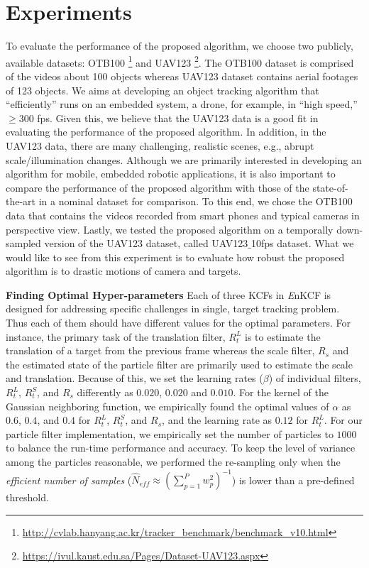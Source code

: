 \documentclass{bmvc2k}
\begin{document}
\section{Experiments} \label{sc:Experiments}
To evaluate the performance of the proposed algorithm, we choose two
publicly, available datasets:
OTB100 \footnote{\url{http://cvlab.hanyang.ac.kr/tracker_benchmark/benchmark_v10.html}}
and
UAV123 \footnote{\url{https://ivul.kaust.edu.sa/Pages/Dataset-UAV123.aspx}}\cite{mueller2016uav123}.
The OTB100 dataset is comprised of the videos about 100 objects
whereas UAV123 dataset contains aerial footages of 123 objects. We
aims at developing an object tracking algorithm that ``efficiently''
runs on an embedded system, a drone, for example, in ``high speed,''
$\ge 300$ fps. Given this, we believe that the UAV123 data is a good
fit in evaluating the performance of the proposed algorithm. In
addition, in the UAV123 data, there are many challenging, realistic
scenes, e.g., abrupt scale/illumination changes. Although we are
primarily interested in developing an algorithm for mobile, embedded
robotic applications, it is also important to compare the performance
of the proposed algorithm with those of the state-of-the-art in a
nominal dataset for comparison. To this end, we chose the OTB100 data
that contains the videos recorded from smart phones and typical
cameras in perspective view. Lastly, we tested the proposed algorithm
on a temporally down-sampled version of the UAV123 dataset, called
UAV123$\_$10fps dataset. What we would like to see from this
experiment is to evaluate how robust the proposed algorithm is to
drastic motions of camera and targets.

\textbf{Finding Optimal Hyper-parameters} Each of three KCFs in {\it
  E}nKCF is designed for addressing specific challenges in single,
target tracking problem. Thus each of them should have different
values for the optimal parameters. For instance, the primary task of
the translation filter, $R_{t}^{L}$ is to estimate the translation of
a target from the previous frame whereas the scale filter, $R_{s}$ and
the estimated state of the particle filter are primarily used to
estimate the scale and translation. Because of this, we set the
learning rates ($\beta$) of individual filters, $R_{t}^{L}$,
$R_{t}^{S}$, and $R_{s}$ differently as $0.020$, $0.020$ and
$0.010$. For the kernel of the Gaussian neighboring function, we
empirically found the optimal values of $\alpha$ as $0.6$, $0.4$, and
$0.4$ for $R_{t}^{L}$, $R_{t}^{S}$, and $R_{s}$, and the learning rate
as $0.12$ for $R_{t}^{L}$. For our particle filter implementation, we
empirically set the number of particles to $1000$ to balance the
run-time performance and accuracy. To keep the level of variance among
the particles reasonable, we performed the re-sampling only when the
\textit{efficient number of samples} ($ \hat{N}_{eff} \approx
(\sum_{p=1}^{P}w_{p}^{2})^{-1} $) is lower than a pre-defined
threshold.
\end{document}
